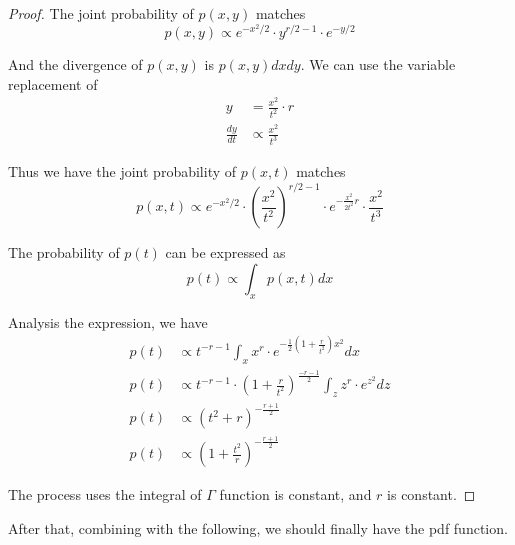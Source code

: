 \documentclass[a4paper]{article}
\begin{document}
\begin{proof}
    The joint probability of $p(x, y)$ matches
    \begin{equation*}
        p(x, y) \propto e^{-x^2/2} \cdot y^{r/2-1} \cdot e^{-y/2}
    \end{equation*}

    And the divergence of $p(x, y)$ is $p(x, y) dx dy$.
    We can use the variable replacement of
    \begin{equation*}
        \begin{aligned}
            y             & = \frac{x^2}{t^2} \cdot r \\
            \frac{dy}{dt} & \propto \frac{x^2}{t^3}
        \end{aligned}
    \end{equation*}

    Thus we have the joint probability of $p(x, t)$ matches
    \begin{equation*}
        p(x, t) \propto e^{-x^2/2} \cdot (\frac{x^2}{t^2})^{r/2-1} \cdot e^{-\frac{x^2}{2t^2}r} \cdot \frac{x^2}{t^3}
    \end{equation*}

    The probability of $p(t)$ can be expressed as
    \begin{equation*}
        p(t) \propto \int_{x} p(x, t) dx
    \end{equation*}

    Analysis the expression, we have
    \begin{equation*}
        \begin{aligned}
            p(t) & \propto t^{-r-1} \int_{x} x^{r} \cdot e^{-\frac{1}{2}(1+\frac{r}{t^2})x^2} dx           \\
            p(t) & \propto t^{-r-1} \cdot (1+\frac{r}{t^2})^\frac{-r-1}{2} \int_{z} z^{r} \cdot e^{z^2} dz \\
            p(t) & \propto (t^2 + r) ^ {-\frac{r+1}{2}}                                                    \\
            p(t) & \propto (1+\frac{t^2}{r})^{-\frac{r+1}{2}}
        \end{aligned}
    \end{equation*}

    The process uses the integral of $\Gamma$ function is constant, and $r$ is constant.
\end{proof}

After that, combining with the following, we should finally have the pdf function.
\end{document}
